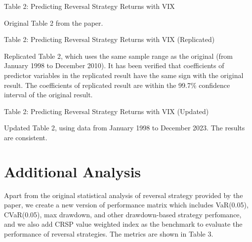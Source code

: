 \documentclass[11pt]{article}
\newcommand*{\PathToOutput}{../output/}
\begin{document}
\begin{landscape}
    \begin{table}[h!]
        \centering
        \caption*{Table 2: Predicting Reversal Strategy Returns with VIX}
        
        \small Original Table 2 from the paper.
        \medskip
        
        \scriptsize
        
    \end{table}
    
    
    \begin{table}[h!]
        \centering
        \caption*{Table 2: Predicting Reversal Strategy Returns with VIX (Replicated)}
    
        \raggedright
        \small Replicated Table 2, which uses the same sample range as the original (from 
        January 1998 to December 2010). 
        It has been verified that coefficients of predictor variables in the replicated result
        have the same sign with the original result. The coefficients of replicated result are
        within the 99.7\% confidence interval of the original result.
        \medskip
        
        \scriptsize
        \centering
        
    \end{table}
    
    \begin{table}[h!]
        \centering
        \caption*{Table 2: Predicting Reversal Strategy Returns with VIX (Updated)}
    
        \small Updated Table 2, using data from January 1998 to December 2023.
        The results are consistent.
        \medskip
        
        \scriptsize
        
    \end{table}
    
    \end{landscape}


\section{Additional Analysis}

Apart from the original statistical analysis of reversal strategy provided by 
the paper, we create a new version of performance matrix which includes VaR(0.05), 
CVaR(0.05), max drawdown, and other drawdown-based strategy perfomance, and we also 
add CRSP value weighted index as the benchmark to evaluate the performance of reversal strategies. 
The metrics are shown in Table 3.
\end{document}
